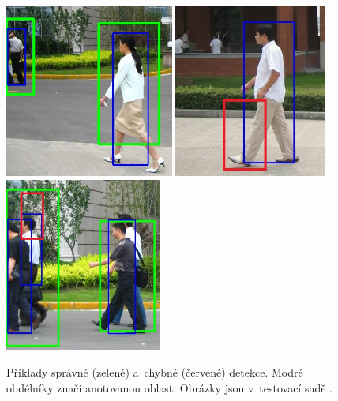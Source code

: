 \begin{figure}[H]
\centering
\includegraphics[keepaspectratio, max height=5.7cm,]{figures/ped/1}%
\hfill %
\includegraphics[keepaspectratio, max height=5.7cm,]{figures/ped/2}%
\hfill %
\includegraphics[keepaspectratio, max height=5.7cm,]{figures/ped/3}%
\caption{Příklady správné (zelené) a~chybné (červené) detekce. Modré obdélníky značí anotovanou oblast. Obrázky jsou v~testovací sadě \cite{testimg}.}
\label{fig:AnotationExample}
\end{figure}


